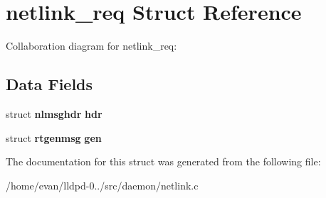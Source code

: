 \section{netlink\-\_\-req \-Struct \-Reference}
\label{structnetlink__req}


\-Collaboration diagram for netlink\-\_\-req\-:
\subsection*{\-Data \-Fields}
\begin{DoxyCompactItemize}
\item 
struct {\bf nlmsghdr} {\bfseries hdr}\label{structnetlink__req_a4237e78b0b2dfd1c4a4bd1f9d8a3bb3c}

\item 
struct {\bf rtgenmsg} {\bfseries gen}\label{structnetlink__req_a69270d8aa66b58c0ed38282e7153de75}

\end{DoxyCompactItemize}


\-The documentation for this struct was generated from the following file\-:\begin{DoxyCompactItemize}
\item 
/home/evan/lldpd-\/0../src/daemon/netlink.\-c\end{DoxyCompactItemize}

